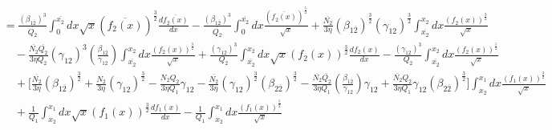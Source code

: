 \documentclass[fleqn, 10pt]{article}
\begin{document}
            \begin{equation*}
            \begin{split}
            &= \frac{(\beta_{1\overline{2}})^3}{\overline{Q_2}} \int^{\overline{x_2}}_0 dx \sqrt{x} (\overline{f_2(x)})^\frac{3}{2} \frac{d\overline{f_2(x)}}{dx} - \frac{(\beta_{1\overline{2}})^3}{\overline{Q_2}} \int^{\overline{x_2}}_0 dx \frac{(\overline{f_2(x)})^\frac{5}{2}}{\sqrt{x}} + \frac{\overline{N_2}}{3 \eta} (\beta_{1\overline{2}})^\frac{3}{2} (\gamma_{12})^\frac{3}{2} \int^{x_2}_{\overline{x_2}} dx \frac{(f_2(x))^\frac{3}{2}}{\sqrt{x}} \\ & \quad - \frac{\overline{N_2} \overline{Q_2}}{3 \eta Q_2} (\gamma_{12})^3 \left(\frac{\beta_{1\overline{2}}}{\gamma_{12}}\right) \int^{x_2}_{\overline{x_2}} dx \frac{(f_2(x))^\frac{3}{2}}{\sqrt{x}} + \frac{(\gamma_{12})^3}{Q_2} \int^{x_2}_{\overline{x_2}} dx \sqrt{x} (f_2(x))^\frac{3}{2} \frac{df_2(x)}{dx} - \frac{(\gamma_{12})^3}{Q_2} \int^{x_2}_{\overline{x_2}} dx \frac{(f_2(x))^\frac{5}{2}}{\sqrt{x}} \\ & \quad + \Biggl[ \frac{\overline{N_2}}{3 \eta} (\beta_{1\overline{2}})^\frac{3}{2} + \frac{N_2}{3 \eta} (\gamma_{12})^\frac{3}{2} - \frac{N_2 Q_2}{3 \eta Q_1} \gamma_{12} - \frac{\overline{N_2}}{3 \eta} (\gamma_{12})^\frac{3}{2} (\beta_{2\overline{2}})^\frac{3}{2} - \frac{\overline{N_2} \overline{Q_2}}{3 \eta Q_1} \left(\frac{\beta_{1\overline{2}}}{\gamma_{12}}\right) \gamma_{12} + \frac{\overline{N_2} Q_2}{3 \eta Q_1} \gamma_{12} (\beta_{2\overline{2}})^\frac{3}{2} \Biggr] \int^{x_1}_{x_2} dx \frac{(f_1(x))^\frac{3}{2}}{\sqrt{x}} \\ & \quad + \frac{1}{Q_1} \int^{x_1}_{x_2} dx \sqrt{x} (f_1(x))^\frac{3}{2} \frac{df_1(x)}{dx} - \frac{1}{Q_1} \int^{x_1}_{x_2} dx \frac{(f_1(x))^\frac{5}{2}}{\sqrt{x}}
            \end{split}
            \end{equation*} 
\end{document}
